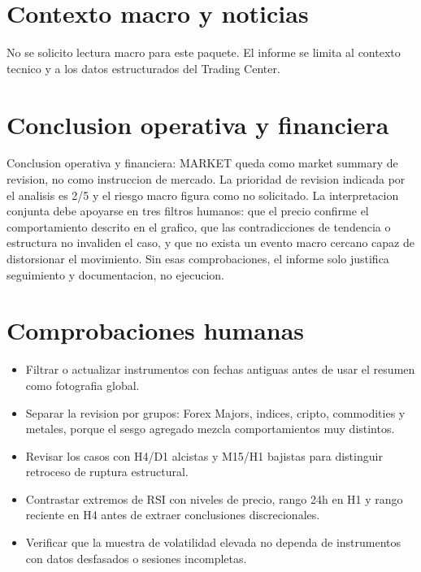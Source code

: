 \documentclass[11pt,a4paper]{article}
\begin{document}
\section*{Contexto macro y noticias}
No se solicito lectura macro para este paquete. El informe se limita al contexto tecnico y a los datos estructurados del Trading Center.

\section*{Conclusion operativa y financiera}
Conclusion operativa y financiera: MARKET queda como market summary de revision, no como instruccion de mercado. La prioridad de revision indicada por el analisis es 2/5 y el riesgo macro figura como no solicitado. La interpretacion conjunta debe apoyarse en tres filtros humanos: que el precio confirme el comportamiento descrito en el grafico, que las contradicciones de tendencia o estructura no invaliden el caso, y que no exista un evento macro cercano capaz de distorsionar el movimiento. Sin esas comprobaciones, el informe solo justifica seguimiento y documentacion, no ejecucion.

\section*{Comprobaciones humanas}
\begin{itemize}
  \item Filtrar o actualizar instrumentos con fechas antiguas antes de usar el resumen como fotografia global.
  \item Separar la revision por grupos: Forex Majors, indices, cripto, commodities y metales, porque el sesgo agregado mezcla comportamientos muy distintos.
  \item Revisar los casos con H4/D1 alcistas y M15/H1 bajistas para distinguir retroceso de ruptura estructural.
  \item Contrastar extremos de RSI con niveles de precio, rango 24h en H1 y rango reciente en H4 antes de extraer conclusiones discrecionales.
  \item Verificar que la muestra de volatilidad elevada no dependa de instrumentos con datos desfasados o sesiones incompletas.
\end{itemize}
\end{document}
